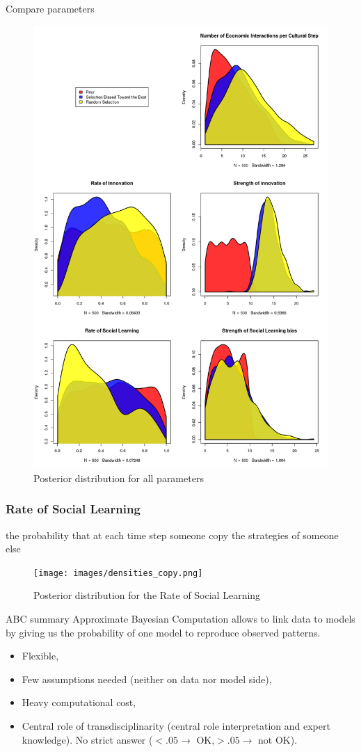 \documentclass[10pt, notes=show]{beamer}
\begin{document}
\begin{frame}{Compare parameters}
    \begin{figure}[!ht]
        \centering
        \includegraphics[width=.4\textwidth]{images/random_vs_bestbias.png}
        \caption{Posterior distribution for all parameters}
    \end{figure}

    \subsubsection{Rate of Social Learning} the probability that at each time step someone copy the strategies of someone else
    
    \begin{figure}[!ht]
        \centering
        \texttt{[image: images/densities\_copy.png]}
        \caption{Posterior distribution for the Rate of Social Learning}
        \label{fig:copy}
    \end{figure}
\end{frame}


\begin{frame}{ABC summary}
    Approximate Bayesian Computation allows to link data to models by giving us the probability of one model to reproduce observed patterns.
    \begin{itemize}
        \item<+-> Flexible,
        \item<+-> Few assumptions needed (neither on data nor model side),
        \item<+-> Heavy computational cost,
        \item<+-> Central role of transdisciplinarity (central role interpretation and expert knowledge). No strict answer ($<.05 \rightarrow$ OK,$>.05 \rightarrow$ not OK).
    \end{itemize}
 
\end{frame}
\end{document}
